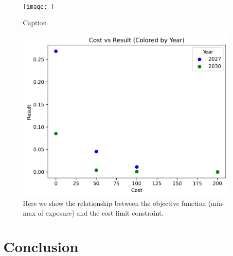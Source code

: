 \documentclass[a4paper]{article}
\theoremstyle{definition}
\theoremstyle{plain}
\begin{document}
\begin{figure}
    \centering
    \texttt{[image: ]}
    \caption{Caption}
    \label{fig:enter-label}
\end{figure}

\begin{figure}
    \centering
    \includegraphics[width=0.7\linewidth]{Figures/EndogenousResults/base_short/exposure_cost_PPF.png}
    \caption{Here we show the relationship between the objective function (min-max of exposure) and the cost limit constraint.}
    \label{PPF}
\end{figure}



\section{Conclusion}


\begin{singlespace}
\newpage

%

\end{singlespace}
\end{document}

